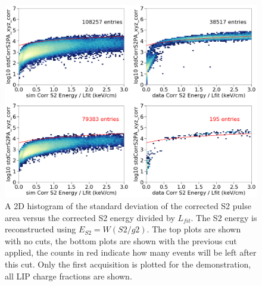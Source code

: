 \begin{figure}[htbp]
\begin{center}
\includegraphics[width=\textwidth]{figures/lips/cut3.png}
\caption{ A 2D histogram of the standard deviation of the corrected S2 pulse area versus the corrected S2 energy divided by $L_{fit}$. The S2 energy is reconstructed using $E_{S2} = W(S2/g2)$. The top plots are shown with no cuts, the bottom plots are shown with the previous cut applied, the counts in red indicate how many events will be left after this cut. Only the first acquisition is plotted for the demonstration, all \acs{LIP} charge fractions are shown.  }
\label{fig:cut3}
\end{center}
\end{figure}

